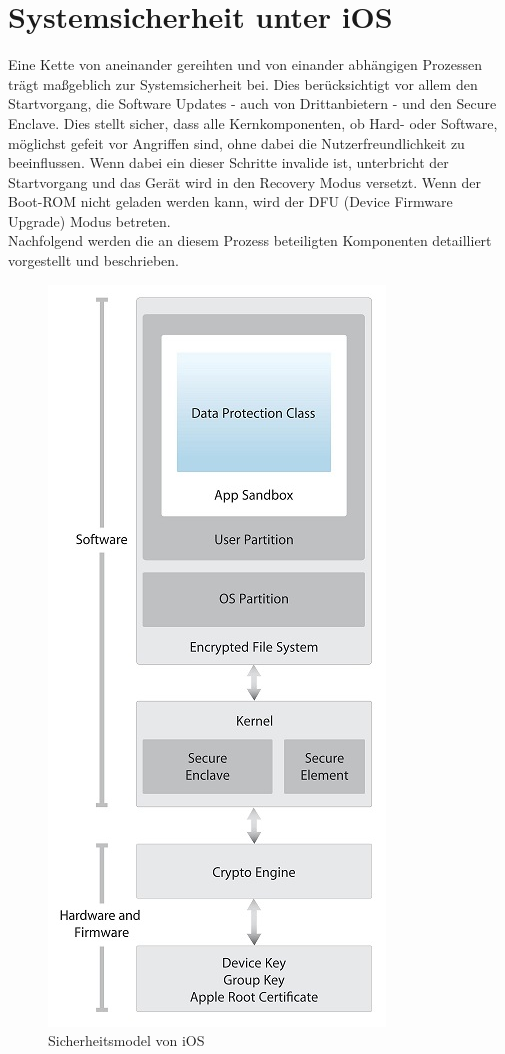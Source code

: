 \section{Systemsicherheit unter iOS}
	Eine Kette von aneinander gereihten und von einander abhängigen Prozessen
	trägt maßgeblich zur Systemsicherheit bei. Dies berücksichtigt vor allem den
	Startvorgang, die Software Updates - auch von Drittanbietern - und den Secure
	Enclave. Dies stellt sicher, dass alle Kernkomponenten, ob Hard- oder
	Software, möglichst gefeit vor Angriffen sind, ohne dabei die
	Nutzerfreundlichkeit zu beeinflussen. Wenn dabei ein dieser Schritte invalide
	ist, unterbricht der Startvorgang und das Gerät wird in den Recovery Modus
	versetzt. Wenn der Boot-ROM nicht geladen werden kann, wird der DFU (Device
	Firmware Upgrade) Modus betreten.\\ 
	Nachfolgend werden die an diesem Prozess beteiligten Komponenten detailliert
	vorgestellt und beschrieben.
	
	\begin{figure}[h]
		\centering
		\includegraphics[width=0.4\linewidth]{ios/media/security-model.jpg}
		\caption{Sicherheitsmodel von iOS \cite{iOSSecurityApr2015}}
		\label{fig:security-model}
	\end{figure}


